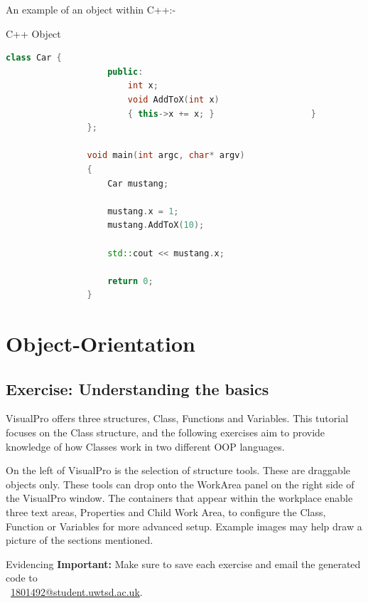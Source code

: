 \documentclass[10pt]{article}
\begin{document}
        \newpage
        An example of an object within C++:-
        \begin{example}{C++ Object}
            \begin{lstlisting}[language=c++]
                class Car {
                    public:
                        int x;
                        void AddToX(int x)
                        { this->x += x; }                   }
                };

                void main(int argc, char* argv)
                {
                    Car mustang;
                    
                    mustang.x = 1;
                    mustang.AddToX(10);
                    
                    std::cout << mustang.x;

                    return 0;
                }
            \end{lstlisting}
        \end{example}
\section{Object-Orientation}
\label{sec:object-orientation}

    \subsection{Exercise: Understanding the basics}
        VisualPro offers three structures, Class, Functions and Variables. This tutorial focuses on the Class structure, and the following exercises aim to provide knowledge of how Classes work in two different OOP languages.

        On the left of VisualPro is the selection of structure tools. These are draggable objects only. These tools can drop onto the WorkArea panel on the right side of the VisualPro window. The containers that appear within the workplace enable three text areas, Properties and Child Work Area, to configure the Class, Function or Variables for more advanced setup. Example images may help draw a picture of the sections mentioned.

        \begin{tip}{Evidencing}
            \textbf{Important:} Make sure to save each exercise and email the generated code to\\~\href{mailto:1801492@student.uwtsd.ac.uk}{1801492@student.uwtsd.ac.uk}.
        \end{tip}
\end{document}

